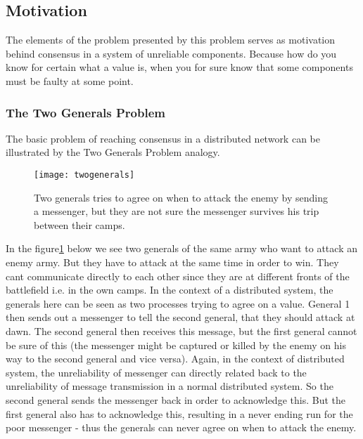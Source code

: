 \subsection{Motivation}
The elements of the problem presented by this problem serves as motivation behind consensus in a system of unreliable components. Because how do you know for certain what a value is, when you for sure know that some components must be faulty at some point.
\subsubsection{The Two Generals Problem}
The basic problem of reaching consensus in a distributed network can be illustrated by the Two Generals Problem analogy.
\begin{figure}[h]
	\centering
	\texttt{[image: twogenerals]}
	\caption{Two generals tries to agree on when to attack the enemy by sending a messenger, but they are not sure the messenger survives his trip between their camps.}
	\label{generals}
\end{figure}
In the figure\ref{generals} below we see two generals of the same army who want to attack an enemy army. But they have to attack at the same time in order to win. They cant communicate directly to each other since they are at different fronts of the battlefield i.e. in the own camps. In the context of a distributed system, the generals here can be seen as two processes trying to agree on a value.
General 1 then sends out a messenger to tell the second general, that they should attack at dawn. The second general then receives this message, but the first general cannot be sure of this (the messenger might be captured or killed by the 
enemy on his way to the second general and vice versa). Again, in the context of distributed system, the unreliability of messenger can directly related back to the unreliability of message transmission in a normal distributed system.
So the second general sends the messenger back in order to acknowledge this. But the first general also has to acknowledge this, resulting in a never ending run for the poor messenger - thus the generals can never agree on when to attack the enemy.


